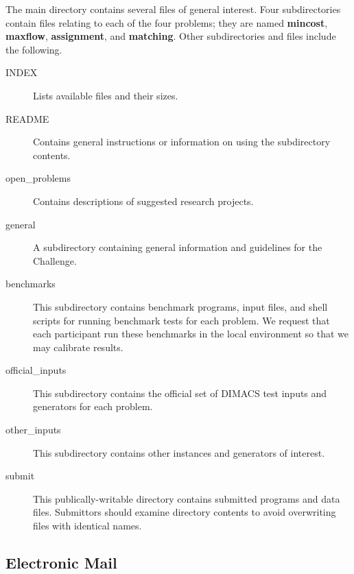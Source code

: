 The main directory contains several files of general interest. 
Four subdirectories contain files relating to each of the four problems;
they are named {\bf mincost}, {\bf maxflow}, {\bf assignment}, and 
{\bf matching}.  Other subdirectories and files include the following. 

\begin{description}

\item[INDEX] Lists available files and their sizes.

\item[README]  Contains general instructions or information on using the 
subdirectory contents. 

\item[open\_problems] Contains descriptions of suggested research 
projects.  

\item[general]  A subdirectory containing general information and
guidelines for the Challenge.  

\item[benchmarks] This subdirectory contains  benchmark programs, 
input files, and shell scripts for running benchmark tests for 
each problem.  We request that each  participant run these 
benchmarks in the local environment so that we may calibrate results. 

\item[official\_inputs] This subdirectory contains the 
official set of DIMACS test inputs and generators for each problem.  

\item[other\_inputs] This subdirectory contains other instances and
generators of interest.  

\item[submit]  This publically-writable directory contains
submitted programs and data files.  Submittors should examine 
directory contents to avoid overwriting files with identical names. 
\end{description} 

\subsection{Electronic Mail}

